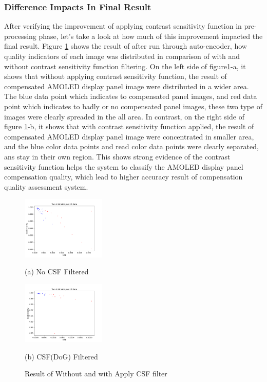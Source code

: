 \documentclass{article}
\begin{document}
\subsubsection{Difference Impacts In Final Result}
After verifying the improvement of applying contrast sensitivity function in pre-processing phase, let's take a look at how much of this improvement impacted the final result. Figure \ref{fig4} shows the result of after run through auto-encoder, how quality indicators of each image was distributed in comparison of with and without contrast sensitivity function filtering.  On the left side of figure\ref{fig4}-a, it shows that without applying contrast sensitivity function, the result of compensated AMOLED display panel image were distributed in a wider area. The blue data point which indicates to compensated panel images, and red data point which indicates to badly or no compensated panel images, these two type of images were clearly spreaded in the all area. In contrast, on the right side of figure \ref{fig4}-b, it shows that with contrast sensitivity function applied, the result of compensated AMOLED display panel image were concentrated in smaller area, and the blue color data points and read color data points were clearly separated, ans stay in their own region. This shows strong evidence of the contrast sensitivity function helps the system to classify the AMOLED display panel compensation quality, which lead to higher accuracy result of compensation quality assessment system.

\begin{figure}[h]
\begin{minipage}[b]{0.48\linewidth}
  \centering
  \centerline{\includegraphics[width=4.0cm]{images/1440P_NoCSFed_0r_123b_result.png}}
  \centerline{(a) No CSF Filtered}\medskip
\end{minipage}
\hfill
\begin{minipage}[b]{0.48\linewidth}
  \centering
  \centerline{\includegraphics[width=4.0cm]{images/1440P_CSFed_0r_123b_result.png}}
  \centerline{(b)  CSF(DoG) Filtered}\medskip
\end{minipage}
%
\caption{Result of Without and with Apply CSF filter}
\label{fig4}
%
\end{figure}
\end{document}
